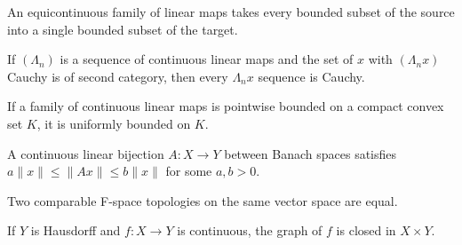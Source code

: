 
\begin{theorem}
  \label{thm:equicontinuous-uniform-bound}
  \leanok
  An equicontinuous family of linear maps takes every bounded subset
  of the source into a single bounded subset of the target.
\end{theorem}

\begin{theorem}
  \label{thm:cauchy-second-category}
  \leanok
  If $(\Lambda_n)$ is a sequence of continuous linear maps and the set
  of $x$ with $(\Lambda_n x)$ Cauchy is of second category, then every
  $\Lambda_n x$ sequence is Cauchy.
\end{theorem}

\begin{theorem}
  \label{thm:banach-steinhaus-compact-convex}
  \leanok
  If a family of continuous linear maps is pointwise bounded on a
  compact convex set $K$, it is uniformly bounded on $K$.
\end{theorem}

\begin{theorem}
  \label{thm:open-mapping-norm-equiv}
  \leanok
  A continuous linear bijection $A : X \to Y$ between Banach spaces
  satisfies $a\|x\| \le \|A x\| \le b\|x\|$ for some $a, b > 0$.
\end{theorem}

\begin{theorem}
  \label{thm:fSpace-topologies-eq}
  \leanok
  Two comparable F-space topologies on the same vector space are
  equal.
\end{theorem}

\begin{theorem}
  \label{thm:graph-closed-of-continuous}
  \leanok
  If $Y$ is Hausdorff and $f : X \to Y$ is continuous, the graph of
  $f$ is closed in $X \times Y$.
\end{theorem}

